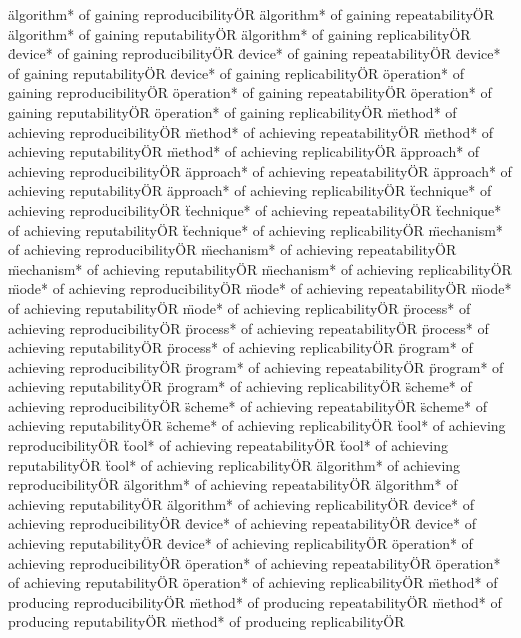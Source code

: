 \documentclass[
10pt, %
a4paper, %
oneside, %
headinclude,footinclude, %
BCOR5mm, %
]{scrartcl}
\begin{document}
\"algorithm* of gaining reproducibility\" OR \"algorithm* of gaining repeatability\" OR \"algorithm* of gaining reputability\" OR \"algorithm* of gaining replicability\" OR 
\"device* of gaining reproducibility\" OR \"device* of gaining repeatability\" OR \"device* of gaining reputability\" OR \"device* of gaining replicability\" OR 
\"operation* of gaining reproducibility\" OR \"operation* of gaining repeatability\" OR \"operation* of gaining reputability\" OR \"operation* of gaining replicability\" OR 
\"method* of achieving reproducibility\" OR \"method* of achieving repeatability\" OR \"method* of achieving reputability\" OR \"method* of achieving replicability\" OR 
\"approach* of achieving reproducibility\" OR \"approach* of achieving repeatability\" OR \"approach* of achieving reputability\" OR \"approach* of achieving replicability\" OR 
\"technique* of achieving reproducibility\" OR \"technique* of achieving repeatability\" OR \"technique* of achieving reputability\" OR \"technique* of achieving replicability\" OR 
\"mechanism* of achieving reproducibility\" OR \"mechanism* of achieving repeatability\" OR \"mechanism* of achieving reputability\" OR \"mechanism* of achieving replicability\" OR 
\"mode* of achieving reproducibility\" OR \"mode* of achieving repeatability\" OR \"mode* of achieving reputability\" OR \"mode* of achieving replicability\" OR 
\"process* of achieving reproducibility\" OR \"process* of achieving repeatability\" OR \"process* of achieving reputability\" OR \"process* of achieving replicability\" OR 
\"program* of achieving reproducibility\" OR \"program* of achieving repeatability\" OR \"program* of achieving reputability\" OR \"program* of achieving replicability\" OR 
\"scheme* of achieving reproducibility\" OR \"scheme* of achieving repeatability\" OR \"scheme* of achieving reputability\" OR \"scheme* of achieving replicability\" OR 
\"tool* of achieving reproducibility\" OR \"tool* of achieving repeatability\" OR \"tool* of achieving reputability\" OR \"tool* of achieving replicability\" OR 
\"algorithm* of achieving reproducibility\" OR \"algorithm* of achieving repeatability\" OR \"algorithm* of achieving reputability\" OR \"algorithm* of achieving replicability\" OR 
\"device* of achieving reproducibility\" OR \"device* of achieving repeatability\" OR \"device* of achieving reputability\" OR \"device* of achieving replicability\" OR 
\"operation* of achieving reproducibility\" OR \"operation* of achieving repeatability\" OR \"operation* of achieving reputability\" OR \"operation* of achieving replicability\" OR 
\"method* of producing reproducibility\" OR \"method* of producing repeatability\" OR \"method* of producing reputability\" OR \"method* of producing replicability\" OR 
\end{document}

